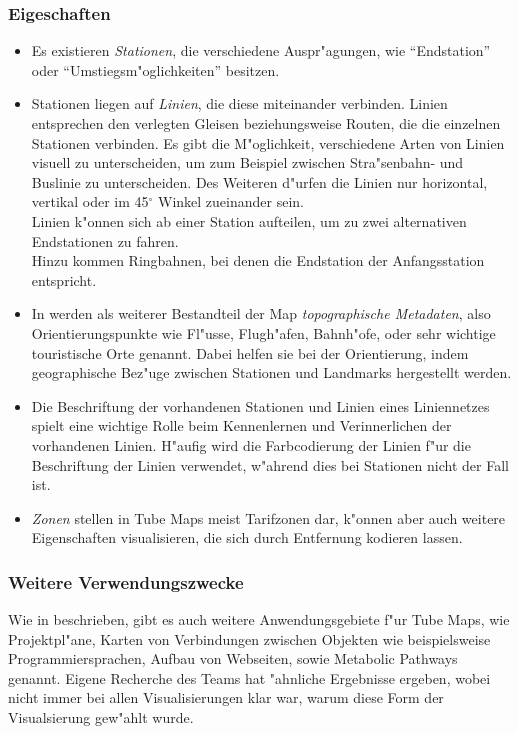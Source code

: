 \subsubsection{Eigeschaften}
\begin{itemize}
\item Es existieren \emph{Stationen}, die verschiedene Auspr"agungen, wie "`Endstation"' oder "`Umstiegsm"oglichkeiten"' besitzen. 

\item Stationen liegen auf \emph{Linien}, die diese miteinander verbinden. Linien entsprechen den verlegten Gleisen beziehungsweise Routen, die die einzelnen Stationen verbinden. Es gibt die M"oglichkeit, verschiedene Arten von Linien visuell zu unterscheiden, um zum Beispiel zwischen Stra"senbahn- und Buslinie zu unterscheiden. Des Weiteren d"urfen die Linien nur horizontal, vertikal oder im 45$^{\circ}$ Winkel zueinander sein. \\
Linien k"onnen sich ab einer Station aufteilen, um zu zwei alternativen Endstationen zu fahren. \\ 
Hinzu kommen Ringbahnen, bei denen die Endstation der Anfangsstation entspricht.

\item In \cite{automaticlayoutmetro08} werden als weiterer Bestandteil der Map \emph{topographische Metadaten}, also Orientierungspunkte wie Fl"usse, Flugh"afen, Bahnh"ofe, oder sehr wichtige touristische Orte genannt. Dabei helfen sie bei der Orientierung, indem geographische Bez"uge zwischen Stationen und Landmarks hergestellt werden.

\item Die Beschriftung der vorhandenen Stationen und Linien eines Liniennetzes spielt eine wichtige Rolle beim Kennenlernen und Verinnerlichen der vorhandenen Linien. H"aufig wird die Farbcodierung der Linien f"ur die Beschriftung der Linien verwendet, w"ahrend dies bei Stationen nicht der Fall ist. 

\item \emph{Zonen} stellen in Tube Maps meist Tarifzonen dar, k"onnen aber auch weitere Eigenschaften visualisieren, die sich durch Entfernung kodieren lassen. 
\end{itemize}

\subsubsection{Weitere Verwendungszwecke}
\label{tm:verwendungszwecke}
Wie in \cite{automaticlayoutmetro08} beschrieben, gibt es auch weitere Anwendungsgebiete f"ur Tube Maps, wie Projektpl"ane, Karten von Verbindungen zwischen Objekten wie beispielsweise Programmiersprachen, Aufbau von Webseiten, sowie Metabolic Pathways genannt. Eigene Recherche des Teams hat "ahnliche Ergebnisse ergeben, wobei nicht immer bei allen Visualisierungen klar war, warum diese Form der Visualsierung gew"ahlt wurde. 

